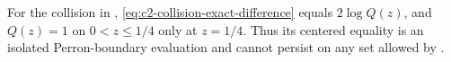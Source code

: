 For the collision in ,
\eqref{eq:c2-collision-exact-difference} equals \(2\log Q(z)\), and
\(Q(z)=1\) on \(0<z\le1/4\) only at \(z=1/4\).  Thus its centered equality
is an isolated Perron-boundary evaluation and cannot persist on any set allowed by
.
